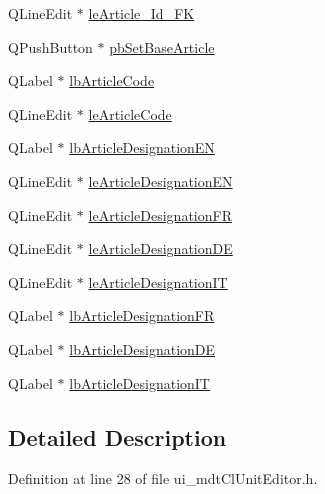 \begin{DoxyCompactItemize}
\item 
Q\-Line\-Edit $\ast$ \hyperlink{class_ui__mdt_cl_unit_editor_a888f05c1a9e646557654dabb133f0bd2}{le\-Article\-\_\-\-Id\-\_\-\-F\-K}
\item 
Q\-Push\-Button $\ast$ \hyperlink{class_ui__mdt_cl_unit_editor_a3905c3deff100172947ace9120fe8ea7}{pb\-Set\-Base\-Article}
\item 
Q\-Label $\ast$ \hyperlink{class_ui__mdt_cl_unit_editor_a3922f25a88fb5976e9735ad610bb9967}{lb\-Article\-Code}
\item 
Q\-Line\-Edit $\ast$ \hyperlink{class_ui__mdt_cl_unit_editor_a783c3cf4ce7ba38a1866a939cd841c74}{le\-Article\-Code}
\item 
Q\-Label $\ast$ \hyperlink{class_ui__mdt_cl_unit_editor_a80204efc140cbcebdc8788e1519476de}{lb\-Article\-Designation\-E\-N}
\item 
Q\-Line\-Edit $\ast$ \hyperlink{class_ui__mdt_cl_unit_editor_ad8ab648836f5fd3b2aa713ff4b253b73}{le\-Article\-Designation\-E\-N}
\item 
Q\-Line\-Edit $\ast$ \hyperlink{class_ui__mdt_cl_unit_editor_ae247566a22c6c55356de4f4920f87a0e}{le\-Article\-Designation\-F\-R}
\item 
Q\-Line\-Edit $\ast$ \hyperlink{class_ui__mdt_cl_unit_editor_a80d023bba371bcb839d001eb0a6f7c73}{le\-Article\-Designation\-D\-E}
\item 
Q\-Line\-Edit $\ast$ \hyperlink{class_ui__mdt_cl_unit_editor_a231e4b45c5c6adcde8760ce345cf8b58}{le\-Article\-Designation\-I\-T}
\item 
Q\-Label $\ast$ \hyperlink{class_ui__mdt_cl_unit_editor_acbfb23e58edb3bff32479eb8274ef514}{lb\-Article\-Designation\-F\-R}
\item 
Q\-Label $\ast$ \hyperlink{class_ui__mdt_cl_unit_editor_ae56ed6426b5f05b1958b0a95e4db1bf3}{lb\-Article\-Designation\-D\-E}
\item 
Q\-Label $\ast$ \hyperlink{class_ui__mdt_cl_unit_editor_a6540ea8b45fe364c657906dc1df581b4}{lb\-Article\-Designation\-I\-T}
\end{DoxyCompactItemize}


\subsection{Detailed Description}


Definition at line 28 of file ui\-\_\-mdt\-Cl\-Unit\-Editor.\-h.



